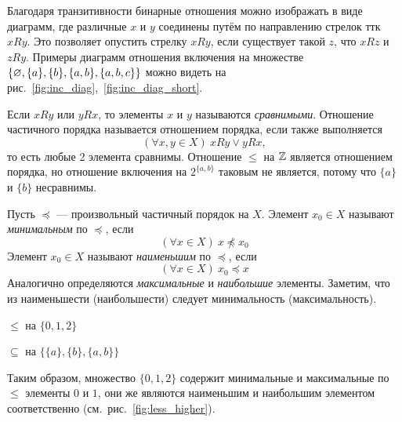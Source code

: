 Благодаря транзитивности бинарные отношения можно изображать в виде диаграмм, где
различные $x$ и $y$ соединены путём по направлению стрелок ттк $xRy$.
Это позволяет опустить стрелку $xRy$, если существует такой $z$, что $xRz$ и $zRy$.
Примеры диаграмм отношения включения на множестве
$\{\varnothing,\{a\},\{b\},\{a,b\}, \{a,b,c\}\}$
можно видеть на рис.~\ref{fig:inc_diag},~\ref{fig:inc_diag_short}.

Если $xRy$ или $yRx$, то элементы $x$ и $y$ называются {\it сравнимыми}.
Отношение частичного порядка называется отношением порядка, если также выполняется
\[
	(\forall x,y\in X)~xRy\lor yRx,
\]
то есть любые 2 элемента сравнимы. Отношение $\leq$ на $\mathbb Z$ является отношением порядка,
но отношение включения на $2^{\{a,b\}}$ таковым не является,
потому что $\{a\}$ и $\{b\}$ несравнимы.

Пусть $\preceq$ --- произвольный частичный порядок на $X$.
Элемент $x_0\in X$ называют {\it минимальным} по $\preceq$, если
\[
	(\forall x\in X)~x\npreceq x_0
\]
Элемент $x_0\in X$ называют {\it наименьшим} по $\preceq$, если
\[
	(\forall x\in X)~x_0\preceq x
\]
Аналогично определяются {\it максимальные} и {\it наибольшие} элементы.
Заметим, что из наименьшести (наибольшести) следует минимальность (максимальность).

\begin{marginfigure}
	\center

	\caption{$\leq$ на $\{0,1,2\}$}\label{fig:less_higher}
\end{marginfigure}

\begin{marginfigure}
	\center

	\caption{$\subseteq$ на $\{\{a\},\{b\},\{a,b\}\}$}\label{fig:min_max}
\end{marginfigure}

Таким образом, множество $\{0,1,2\}$ содержит минимальные и максимальные по $\leq$
элементы $0$ и $1$, они же являются наименьшим и
наибольшим элементом соответственно (см.~рис.~\ref{fig:less_higher}).

